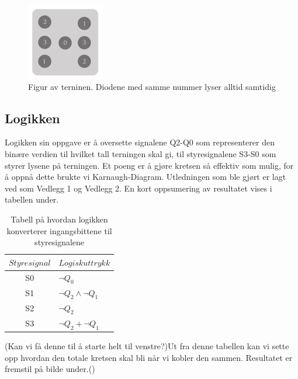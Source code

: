 \documentclass[12pt,norsk,a4paper]{article}
\begin{document}
    \begin{figure}[H]
    \begin{center}
    \includegraphics[scale=1]{Terning.png}
    \caption{Figur av terninen. Diodene med samme nummer lyser alltid samtidig}
    \label{fig:terning}
    \end{center}
    \end{figure}

    \subsection{Logikken}
    Logikken sin oppgave er å oversette signalene Q2-Q0 som representerer den binære verdien til hvilket tall terningen skal gi, til styresignalene S3-S0 som styrer lysene på terningen. Et poeng er å gjøre kretsen så effektiv som mulig, for å oppnå dette brukte vi Karnaugh-Diagram. Utledningen som ble gjørt er lagt ved som Vedlegg 1 og Vedlegg 2. En kort oppsumering av resultatet vises i tabellen under.\\

    \begin{table}[H] 
    \begin{center}
        \begin{tabular}{ | c | l |} 
        \hline
        $Styresignal$  & $Logisk uttrykk$ \\ \hline 
        S0 & $\neg Q_0$\\ \hline
        S1 & $\neg Q_2 \wedge \neg Q_1$\\ \hline
        S2 & $\neg Q_2$\\ \hline
        S3 & $\neg Q_2 + \neg Q_1$\\ \hline
        \hline
        \end{tabular}
        \end{center}
        \caption{Tabell på hvordan logikken konverterer ingangsbittene til styresignalene}

\end{table}

    (Kan vi få denne til å starte helt til venstre?)Ut fra denne tabellen kan vi sette opp hvordan den totale kretsen skal bli når vi kobler den sammen. Resultatet er fremstil på bilde under.() 
\end{document}
